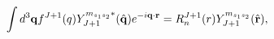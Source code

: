 \begin{equation}
\int d^{3}\mathbf{q}f^{J+1}(q)Y_{J+1}^{m_{s_{1}s_{2}}\ast }(\hat{\mathbf{%
q}})e^{-i\mathbf{q}\cdot \mathbf{r}}=
R_{n}^{J+1}(r)Y_{J+1}^{m_{s_{1}s_{2}}}(\hat{\mathbf{r}}),
\end{equation}

